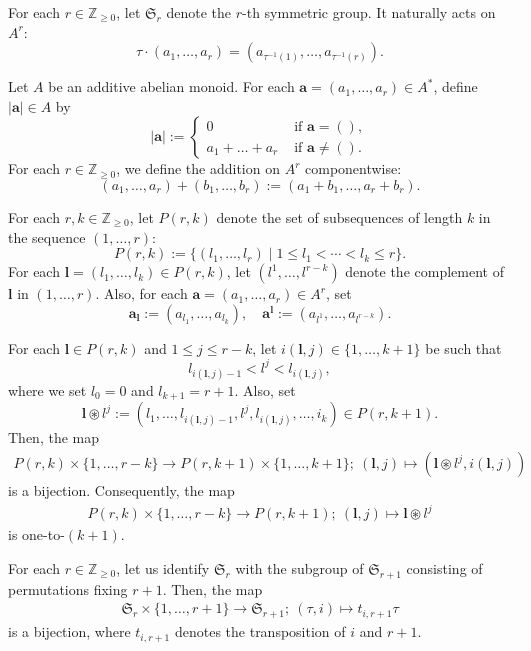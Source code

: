 \documentclass[12pt,a4paper]{amsart}
\theoremstyle{definition}
\numberwithin{equation}{subsection}
\begin{document}
For each $r \in \mathbb{Z}_{\geq 0}$, let $\mathfrak{S}_r$ denote the $r$-th symmetric group.
It naturally acts on $A^r$:
\[
  \tau \cdot (a_1,\dots,a_r) = (a_{\tau^{-1}(1)},\dots,a_{\tau^{-1}(r)}).
\]

Let $A$ be an additive abelian monoid.
For each $\mathbf{a} = (a_1,\dots,a_r) \in A^*$, define $|\mathbf{a}| \in A$ by
\[
  |\mathbf{a}| := \begin{cases}
    0 & \text{ if } \mathbf{a} = (),\\
    a_1 + \dots + a_r & \text{ if } \mathbf{a} \neq ().
  \end{cases}
\]
For each $r \in \mathbb{Z}_{\geq 0}$, we define the addition on $A^r$ componentwise:
\[
  (a_1,\dots,a_r) + (b_1,\dots,b_r) := (a_1+b_1,\dots,a_r+b_r).
\]

For each $r,k \in \mathbb{Z}_{\geq 0}$, let $P(r,k)$ denote the set of subsequences of length $k$ in the sequence $(1,\dots,r)$:
\[
  P(r,k) := \{ (l_1,\dots,l_r) \mid 1 \leq l_1 < \cdots < l_k \leq r \}.
\]
For each $\mathbf{l} = (l_1,\dots,l_k) \in P(r,k)$, let $(l^1,\dots,l^{r-k})$ denote the complement of $\mathbf{l}$ in $(1,\dots,r)$.
Also, for each $\mathbf{a} = (a_1,\dots,a_r) \in A^r$, set
\[
  \mathbf{a}_\mathbf{l} := (a_{l_1},\dots,a_{l_k}), \quad \mathbf{a}^\mathbf{l} := (a_{l^1},\dots,a_{l^{r-k}}).
\]

For each $\mathbf{l} \in P(r,k)$ and $1 \leq j \leq r-k$, let $i(\mathbf{l},j) \in \{ 1,\dots,k+1\}$ be such that
\[
  l_{i(\mathbf{l},j)-1} < l^j < l_{i(\mathbf{l},j)},
\]
where we set $l_0 = 0$ and $l_{k+1} = r+1$.
Also, set
\[
  \mathbf{l} \circledast l^j := (l_1,\dots,l_{i(\mathbf{l},j)-1},l^j,l_{i(\mathbf{l},j)},\dots,i_k) \in P(r,k+1).
\]
Then, the map
\begin{align}\label{eq: (l,j) to (l*lj,i)}
  P(r,k) \times \{ 1,\dots,r-k \} \to P(r,k+1) \times \{ 1,\dots,k+1 \};\ (\mathbf{l},j) \mapsto (\mathbf{l} \circledast l^j,i(\mathbf{l},j))
\end{align}
is a bijection.
Consequently, the map
\begin{align}\label{eq: (l,j) to l*j}
  P(r,k) \times \{ 1,\dots,r-k \} \to P(r,k+1);\ (\mathbf{l},j) \mapsto \mathbf{l} \circledast l^j
\end{align}
is one-to-$(k+1)$.

For each $r \in \mathbb{Z}_{\geq 0}$, let us identify $\mathfrak{S}_r$ with the subgroup of $\mathfrak{S}_{r+1}$ consisting of permutations fixing $r+1$.
Then, the map
\begin{align}\label{eq: Sr r+1 to Sr+1}
  \mathfrak{S}_r \times \{ 1,\dots,r+1 \} \to \mathfrak{S}_{r+1};\ (\tau,i) \mapsto t_{i,r+1} \tau
\end{align}
is a bijection, where $t_{i,r+1}$ denotes the transposition of $i$ and $r+1$.
\end{document}
